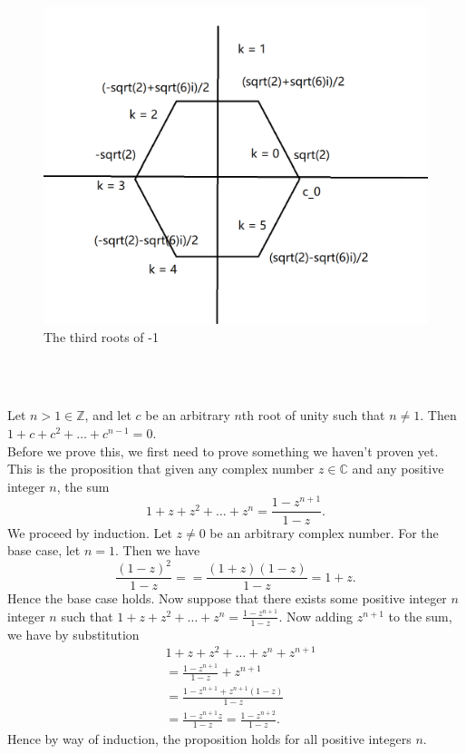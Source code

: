 \documentclass{article}
\theoremstyle{definition}
\newcommand{\Z}{\mathbb{Z}}
\newcommand{\C}{\mathbb{C}}
\newcommand{\cs}[1]{\color{blue}{#1}\normalcolor}
\begin{document}
\begin{figure}[htbp]
\centerline{\includegraphics[scale=0.5]{6roots.png}}
\caption{The third roots of -1}
\label{fig}
\end{figure}\\
\\
\cs{I think Figure 2 is mislabeled...}

 Let $n>1\in \Z$, and let $c$ be an arbitrary $n$th root of unity such that $n \ne 1$. Then $1 + c + c^2+\dots+c^{n-1} = 0$.\\
 Before we prove this, we first need to prove something we haven't proven yet. This is the proposition that given any complex number $z\in \C$ and any positive integer $n$, the sum 
$$1 + z +  z^2 + \dots + z^n = \frac{1-z^{n+1}}{1-z}.$$
 We proceed by induction. Let $z \ne 0$ be an arbitrary complex number. For the base case, let $n = 1$. Then we have $$\frac{(1 - z)^2}{1-z} =  = \frac{(1+z)(1-z)}{1-z} = 1+z.$$ Hence the base case holds. Now suppose that there exists some positive integer $n$ integer $n$ such that $1+z+z^2+\dots+z^n = \frac{1-z^{n+1}}{1-z}$. Now adding $z^{n+1}$ to the sum, we have by substitution $$\begin{array}{cc}
     &  1+z+z^2+\dots+z^n+z^{n+1} \\
     & = \frac{1-z^{n+1}}{1-z}+z^{n+1}\\
     & = \frac{1-z^{n+1}+z^{n+1}(1-z)}{1-z}\\
     & = \frac{1-z^{n+1}z}{1-z} = \frac{1-z^{n+2}}{1-z}.
\end{array} $$
Hence by way of induction, the proposition holds for all positive integers $n$.\\
\end{document}
